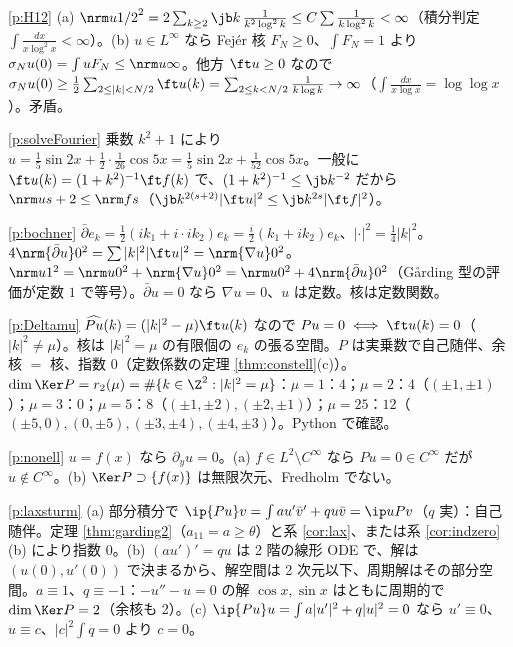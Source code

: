 \begin{sol}{\ref{p:H12}}
(a) $\nrm u{1/2}^2=2\sum_{k\ge2}\jb k\,\frac1{k^2\log^2k}\le C\sum\frac1{k\log^2k}<\infty$（積分判定 $\int\frac{dx}{x\log^2x}<\infty$）。(b) $u\in L^\infty$ なら Fejér 核 $F_N\ge0$、$\int F_N=1$ より $\sigma_Nu(0)=\int uF_N\le\nrm u\infty$。他方 $\ft u\ge0$ なので $\sigma_Nu(0)\ge\frac12\sum_{2\le|k|<N/2}\ft u(k)=\sum_{2\le k<N/2}\frac1{k\log k}\to\infty$（$\int\frac{dx}{x\log x}=\log\log x$）。矛盾。
\end{sol}
\begin{sol}{\ref{p:solveFourier}}
乗数 $k^2+1$ により $u=\frac15\sin2x+\frac12\cdot\frac1{26}\cos5x=\frac15\sin2x+\frac1{52}\cos5x$。一般に $\ft u(k)=(1+k^2)^{-1}\ft f(k)$ で、$(1+k^2)^{-1}\le\jb k^{-2}$ だから $\nrm u{s+2}\le\nrm fs$（$\jb k^{2(s+2)}|\ft u|^2\le\jb k^{2s}|\ft f|^2$）。
\end{sol}
\begin{sol}{\ref{p:bochner}}
$\bar\partial e_k=\frac12(ik_1+i\cdot ik_2)e_k=\frac i2(k_1+ik_2)e_k$、$|\cdot|^2=\frac14|k|^2$。$4\nrm{\bar\partial u}0^2=\sum|k|^2|\ft u|^2=\nrm{\nabla u}0^2$。$\nrm u1^2=\nrm u0^2+\nrm{\nabla u}0^2=\nrm u0^2+4\nrm{\bar\partial u}0^2$（Gårding 型の評価が定数 $1$ で等号）。$\bar\partial u=0$ なら $\nabla u=0$、$u$ は定数。核は定数関数。
\end{sol}
\begin{sol}{\ref{p:Deltamu}}
$\widehat{Pu}(k)=(|k|^2-\mu)\ft u(k)$ なので $Pu=0\iff\ft u(k)=0$（$|k|^2\ne\mu$）。核は $|k|^2=\mu$ の有限個の $e_k$ の張る空間。$P$ は実乗数で自己随伴、余核 $=$ 核、指数 $0$（定数係数の定理 \ref{thm:constell}(c)）。$\dim\Ker P=r_2(\mu)=\#\{k\in\Z^2:|k|^2=\mu\}$：$\mu=1$：$4$；$\mu=2$：$4$（$(\pm1,\pm1)$）；$\mu=3$：$0$；$\mu=5$：$8$（$(\pm1,\pm2),(\pm2,\pm1)$）；$\mu=25$：$12$（$(\pm5,0),(0,\pm5),(\pm3,\pm4),(\pm4,\pm3)$）。Python で確認。
\end{sol}
\begin{sol}{\ref{p:nonell}}
$u=f(x)$ なら $\partial_yu=0$。(a) $f\in L^2\setminus C^\infty$ なら $Pu=0\in C^\infty$ だが $u\notin C^\infty$。(b) $\Ker P\supset\{f(x)\}$ は無限次元、Fredholm でない。
\end{sol}
\begin{sol}{\ref{p:laxsturm}}
(a) 部分積分で $\ip{Pu}v=\int au'\bar v'+qu\bar v=\ip u{Pv}$（$q$ 実）：自己随伴。定理 \ref{thm:garding2}（$a_{11}=a\ge\theta$）と系 \ref{cor:lax}、または系 \ref{cor:indzero}(b) により指数 $0$。(b) $(au')'=qu$ は 2 階の線形 ODE で、解は $(u(0),u'(0))$ で決まるから、解空間は 2 次元以下、周期解はその部分空間。$a\equiv1$、$q\equiv-1$：$-u''-u=0$ の解 $\cos x,\sin x$ はともに周期的で $\dim\Ker P=2$（余核も 2）。(c) $\ip{Pu}u=\int a|u'|^2+q|u|^2=0$ なら $u'\equiv0$、$u\equiv c$、$|c|^2\int q=0$ より $c=0$。
\end{sol}

